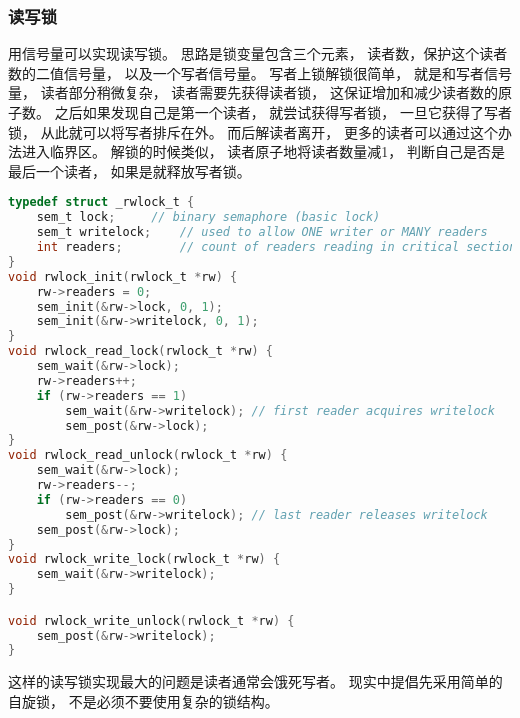 \subsubsection{读写锁}
用信号量可以实现读写锁。
思路是锁变量包含三个元素，
读者数，保护这个读者数的二值信号量，
以及一个写者信号量。
写者上锁解锁很简单，
就是和写者信号量，
读者部分稍微复杂，
读者需要先获得读者锁，
这保证增加和减少读者数的原子数。
之后如果发现自己是第一个读者，
就尝试获得写者锁，
一旦它获得了写者锁，
从此就可以将写者排斥在外。
而后解读者离开，
更多的读者可以通过这个办法进入临界区。
解锁的时候类似，
读者原子地将读者数量减1，
判断自己是否是最后一个读者，
如果是就释放写者锁。
\begin{lstlisting}[language=C]
typedef struct _rwlock_t {
	sem_t lock;		// binary semaphore (basic lock)
	sem_t writelock;	// used to allow ONE writer or MANY readers
	int readers;		// count of readers reading in critical section
}
void rwlock_init(rwlock_t *rw) {
	rw->readers = 0;
	sem_init(&rw->lock, 0, 1);
	sem_init(&rw->writelock, 0, 1);
}
void rwlock_read_lock(rwlock_t *rw) {
	sem_wait(&rw->lock);
	rw->readers++;
	if (rw->readers == 1)
		sem_wait(&rw->writelock); // first reader acquires writelock
        sem_post(&rw->lock);
}
void rwlock_read_unlock(rwlock_t *rw) {
	sem_wait(&rw->lock);
	rw->readers--;
	if (rw->readers == 0)
		sem_post(&rw->writelock); // last reader releases writelock
	sem_post(&rw->lock);
}
void rwlock_write_lock(rwlock_t *rw) {
	sem_wait(&rw->writelock);
}

void rwlock_write_unlock(rwlock_t *rw) {
	sem_post(&rw->writelock);
}
\end{lstlisting}
这样的读写锁实现最大的问题是读者通常会饿死写者。
现实中提倡先采用简单的自旋锁，
不是必须不要使用复杂的锁结构。

